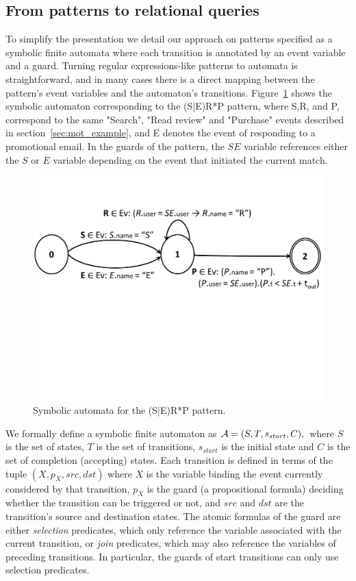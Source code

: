 \subsection{From patterns to relational queries}

To simplify the presentation we detail our approach on patterns specified as a 
symbolic finite automata where each transition is annotated by an event 
variable and a guard.
Turning regular expressions-like patterns to automata is straightforward,
and in many cases there is a direct mapping between the pattern's event 
variables and the automaton's transitions.
Figure~\ref{fig:serp_pattern} shows the symbolic automaton corresponding to the 
(S|E)R*P pattern, where S,R, and P, correspond to the same "Search", "Read 
review" and "Purchase" events described in section~\ref{sec:mot_example}, and E 
denotes the event of responding to a promotional email.
In the guards of the pattern, the $SE$ variable references either the $S$ or 
$E$ variable depending on the event that initiated the current match. 


\begin{figure}[t]
	\centering
	\includegraphics[clip, trim=0cm 10cm 0cm 3cm,width=\columnwidth]
	{graphs/example_sm3.pdf}
	\caption{Symbolic automata for the (S|E)R*P pattern.}
	\label{fig:serp_pattern}
\end{figure}


We formally define a symbolic finite automaton as $\mathcal{A} = (S, T, s_{start}, C),$ 
where $S$ is the set of states, $T$ is the set of transitions, $s_{start}$ is 
the initial state and $C$ is the set of completion (accepting) states.
Each transition is defined in terms of the tuple $(X, p_X, src, dst)$ where $X$ 
is the variable binding the event currently considered by that transition, 
$p_X$ is the guard (a propositional formula) 
deciding whether the transition can be triggered or not, and $src$ and $dst$ 
are the transition's source and destination states.  
The atomic formulas of the guard are either {\em selection} predicates, which 
only reference the variable associated with the current transition,
or {\em join} predicates, which may also reference the variables of preceding 
transitions.
In particular, the guards of start transitions can only use selection 
predicates.  


